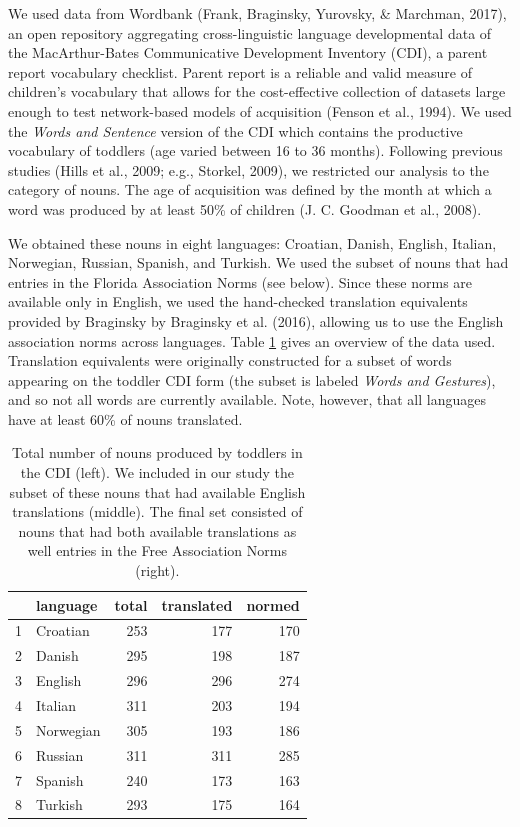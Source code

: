 \documentclass[10pt, letterpaper]{article}
\begin{document}
We used data from Wordbank (Frank, Braginsky, Yurovsky, \& Marchman,
2017), an open repository aggregating cross-linguistic language
developmental data of the MacArthur-Bates Communicative Development
Inventory (CDI), a parent report vocabulary checklist. Parent report is
a reliable and valid measure of children's vocabulary that allows for
the cost-effective collection of datasets large enough to test
network-based models of acquisition (Fenson et al., 1994). We used the
\emph{Words and Sentence} version of the CDI which contains the
productive vocabulary of toddlers (age varied between 16 to 36 months).
Following previous studies (Hills et al., 2009; e.g., Storkel, 2009), we
restricted our analysis to the category of nouns. The age of acquisition
was defined by the month at which a word was produced by at least 50\%
of children (J. C. Goodman et al., 2008).

We obtained these nouns in eight languages: Croatian, Danish, English,
Italian, Norwegian, Russian, Spanish, and Turkish. We used the subset of
nouns that had entries in the Florida Association Norms (see below).
Since these norms are available only in English, we used the
hand-checked translation equivalents provided by Braginsky by Braginsky
et al. (2016), allowing us to use the English association norms across
languages. Table \ref{tab:stats} gives an overview of the data used.
Translation equivalents were originally constructed for a subset of
words appearing on the toddler CDI form (the subset is labeled
\emph{Words and Gestures}), and so not all words are currently
available. Note, however, that all languages have at least 60\% of nouns
translated.

\begin{table}[H]
\centering
\begin{tabular}{rlrrr}
  \hline
 & language & total & translated & normed \\ 
  \hline
1 & Croatian & 253 & 177 & 170 \\ 
  2 & Danish & 295 & 198 & 187 \\ 
  3 & English & 296 & 296 & 274 \\ 
  4 & Italian & 311 & 203 & 194 \\ 
  5 & Norwegian & 305 & 193 & 186 \\ 
  6 & Russian & 311 & 311 & 285 \\ 
  7 & Spanish & 240 & 173 & 163 \\ 
  8 & Turkish & 293 & 175 & 164 \\ 
   \hline
\end{tabular}
\caption{\label{tab:stats}Total number of nouns produced by toddlers in the CDI (left). We included in our study the subset of these nouns that had available English translations (middle). The final set consisted of nouns that had both available translations as well entries in the Free Association Norms (right).} 
\end{table}
\end{document}
